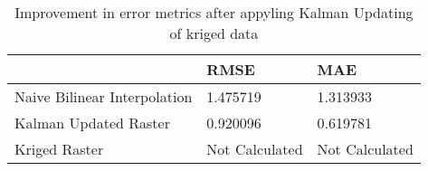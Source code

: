 \begin{table}
\caption{Improvement in error metrics after appyling Kalman Updating of kriged data}
\label{tab:petten_lidar_error}
\begin{tabular}{lll}
\toprule
 & RMSE & MAE \\
\midrule
Naive Bilinear Interpolation & 1.475719 & 1.313933 \\
Kalman Updated Raster & 0.920096 & 0.619781 \\
Kriged Raster & Not Calculated & Not Calculated \\
\bottomrule
\end{tabular}
\end{table}
